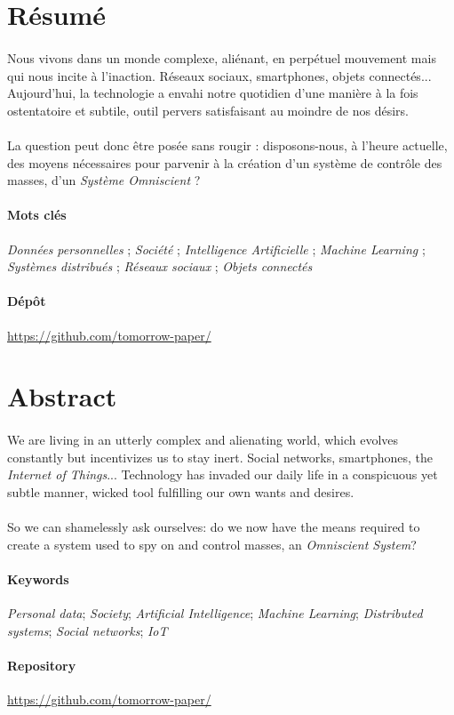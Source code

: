 \section*{Résumé}

\paragraph{} Nous vivons dans un monde complexe, aliénant, en perpétuel mouvement mais qui
nous incite à l'inaction. Réseaux sociaux, smartphones, objets connectés... Aujourd'hui, la
technologie a envahi notre quotidien d'une manière à la fois ostentatoire et subtile, outil
pervers satisfaisant au moindre de nos désirs.

\paragraph{} La question peut donc être posée sans rougir : disposons-nous, à l'heure
actuelle, des moyens nécessaires pour parvenir à la création d'un système de contrôle des
masses, d'un \emph{Système Omniscient} ?

\paragraph{Mots clés}
\emph{Données personnelles} ;
\emph{Société} ;
\emph{Intelligence Artificielle} ;
\emph{Machine Learning} ;
\emph{Systèmes distribués} ;
\emph{Réseaux sociaux} ;
\emph{Objets connectés}

\paragraph{Dépôt} \url{https://github.com/tomorrow-paper/}


\section*{Abstract}

\paragraph{} We are living in an utterly complex and alienating world, which evolves constantly
but incentivizes us to stay inert. Social networks, smartphones, the \emph{Internet of Things}...
Technology has invaded our daily life in a conspicuous yet subtle manner, wicked tool fulfilling
our own wants and desires.

\paragraph{} So we can shamelessly ask ourselves: do we now have the means required to create
a system used to spy on and control masses, an \emph{Omniscient System}?

\paragraph{Keywords}
\emph{Personal data};
\emph{Society};
\emph{Artificial Intelligence};
\emph{Machine Learning};
\emph{Distributed systems};
\emph{Social networks};
\emph{IoT}

\paragraph{Repository} \url{https://github.com/tomorrow-paper/}